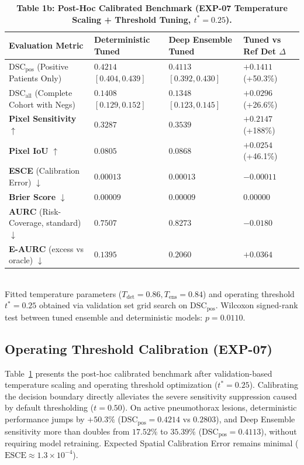 \documentclass[11pt,a4paper]{article}
\begin{document}
\begin{table}[t]
\centering
\small
\caption{\textbf{Table 1b: Post-Hoc Calibrated Benchmark (EXP-07 Temperature Scaling + Threshold Tuning, $t^* = 0.25$).}}
\label{tab:calibrated_benchmark}
\begin{tabularx}{\linewidth}{l X X X}
\toprule
\textbf{Evaluation Metric} & \textbf{Deterministic Tuned} & \textbf{Deep Ensemble Tuned} & \textbf{Tuned vs Ref Det $\Delta$} \\
\midrule
$\text{DSC}_{\text{pos}}$ (Positive Patients Only) & $\mathbf{0.4214}$ $[0.404, 0.439]$ & $0.4113$ $[0.392, 0.430]$ & $\mathbf{+0.1411}$ (+50.3\%) \\
$\text{DSC}_{\text{all}}$ (Complete Cohort with Negs) & $0.1408$ $[0.129, 0.152]$ & $0.1348$ $[0.123, 0.145]$ & $+0.0296$ (+26.6\%) \\
\midrule
\textbf{Pixel Sensitivity} $\uparrow$ & $0.3287$ & $\mathbf{0.3539}$ & $\mathbf{+0.2147}$ (+188\%) \\
\textbf{Pixel IoU} $\uparrow$ & $0.0805$ & $\mathbf{0.0868}$ & $+0.0254$ (+46.1\%) \\
\textbf{ESCE} (Calibration Error) $\downarrow$ & $0.00013$ & $0.00013$ & $-0.00011$ \\
\textbf{Brier Score} $\downarrow$ & $0.00009$ & $0.00009$ & $0.00000$ \\
\textbf{AURC} (Risk-Coverage, standard) $\downarrow$ & $\mathbf{0.7507}$ & $0.8273$ & $-0.0180$ \\
\textbf{E-AURC} (excess vs oracle) $\downarrow$ & $\mathbf{0.1395}$ & $0.2060$ & $+0.0364$ \\
\bottomrule
\end{tabularx}
\\[2pt]
{\footnotesize Fitted temperature parameters ($T_{\text{det}} = 0.86, T_{\text{ens}} = 0.84$) and operating threshold $t^* = 0.25$ obtained via validation set grid search on $\text{DSC}_{\text{pos}}$. Wilcoxon signed-rank test between tuned ensemble and deterministic models: $p = 0.0110$.}
\end{table}

\subsection{Operating Threshold Calibration (EXP-07)}
Table~\ref{tab:calibrated_benchmark} presents the post-hoc calibrated benchmark after validation-based temperature scaling and operating threshold optimization ($t^* = 0.25$). Calibrating the decision boundary directly alleviates the severe sensitivity suppression caused by default thresholding ($t = 0.50$). On active pneumothorax lesions, deterministic performance jumps by $+50.3\%$ ($\text{DSC}_{\text{pos}} = 0.4214$ vs $0.2803$), and Deep Ensemble sensitivity more than doubles from $17.52\%$ to $35.39\%$ ($\text{DSC}_{\text{pos}} = 0.4113$), without requiring model retraining. Expected Spatial Calibration Error remains minimal ($\text{ESCE} \approx 1.3 \times 10^{-4}$).
\end{document}
